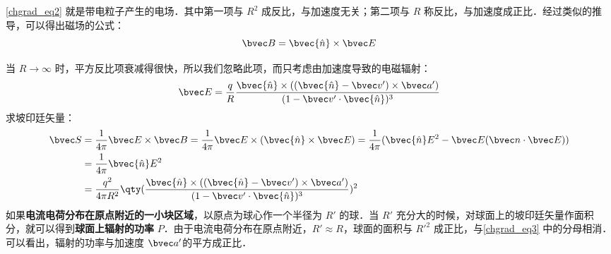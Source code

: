 \autoref{chgrad_eq2}  就是带电粒子产生的电场．其中第一项与 $R^2$ 成反比，与加速度无关；第二项与 $R$ 称反比，与加速度成正比．经过类似的推导，可以得出磁场的公式：
\begin{equation}
\bvec B=\bvec{\hat n} \times \bvec E
\end{equation}

当 $R\rightarrow \infty$ 时，平方反比项衰减得很快，所以我们忽略此项，而只考虑由加速度导致的电磁辐射：
\begin{equation}
\bvec E=\frac{q}{R}\frac{\bvec{\hat n}\times ((\bvec{\hat n}-\bvec v')\times \bvec a')}{(1-\bvec v'\cdot \bvec{\hat n})^3}
\end{equation}
求坡印廷矢量：
\begin{equation}\label{chgrad_eq3}
\begin{aligned}
\bvec S&=\frac{1}{4\pi}\bvec E\times \bvec B=\frac{1}{4\pi}\bvec E\times (\bvec{\hat n}\times \bvec E)=\frac{1}{4\pi}(\bvec{\hat n}E^2-\bvec E(\bvec n\cdot \bvec E))\\
&=\frac{1}{4\pi}\bvec {\hat n}E^2\\
&=\frac{q^2}{4\pi R^2}\qty(\frac{\bvec{\hat n}\times ((\bvec{\hat n}-\bvec v')\times \bvec a')}{(1-\bvec v'\cdot \bvec{\hat n})^3})^2
\end{aligned}
\end{equation}
如果\textbf{电流电荷分布在原点附近的一小块区域}，以原点为球心作一个半径为 $R'$ 的球．当 $R'$ 充分大的时候，对球面上的坡印廷矢量作面积分，就可以得到\textbf{球面上辐射的功率} $P$．由于电流电荷分布在原点附近，$R'\approx R$，球面的面积与 $R'^2$ 成正比，与\autoref{chgrad_eq3} 中的分母相消．可以看出，辐射的功率与加速度 $\bvec a'$的平方成正比．
